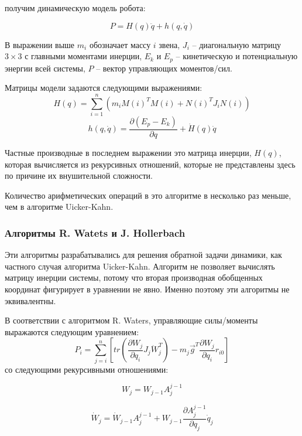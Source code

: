 получим динамическую модель робота:

\begin{equation}
P = H(q) \ddot q + h(q, \dot q)
\end{equation}

В выражении выше $m_i$ обозначает массу $i$ звена, $J_i$ -- диагональную матрицу $3 \times 3$ с главными моментами инерции, $E_k$ и $E_p$ -- кинетическую и потенциальную энергии всей системы, $P$ -- вектор управляющих моментов/сил.

Матрицы модели задаются следующими выражениями:
\begin{equation}
H(q) = \sum_{i=1}^{n}
(
m_i M(i)^T M(i) + N(i)^T J_i N(i)
)
\end{equation}
\begin{equation}
h(q, \dot q) = \frac{\partial (E_p - E_k)}{\partial q} + \dot H(q) \dot q
\end{equation}

Частные производные в последнем выражении это матрица инерции, $H(q)$, которая вычисляется из рекурсивных отношений, которые не представлены здесь по причине их внушительной сложности.

Количество арифметических операций в это алгоритме в несколько раз меньше, чем в алгоритме Uicker-Kahn. 

\subsubsection{Алгоритмы R. Watets и J. Hollerbach}
Эти алгоритмы разрабатывались для решения обратной задачи динамики, как частного случая алгоритма Uicker-Kahn.
Алгоритм не позволяет вычислять матрицу инерции системы, потому что вторая производная обобщенных координат фигурирует в уравнении не явно. Именно поэтому эти алгоритмы не эквивалентны.

В соответствии с алгоритмом R. Waters, управляющие силы/моменты выражаются следующим уравнением:
\begin{equation}
\label{eq6}
P_i = 
\sum_{j=i}^{n}
\left[
tr(
\frac{\partial W_j}{\partial q_i} J_j \ddot W_j^T
)
- m_j \vec g^T \frac{\partial W_j}{\partial q_i} r_{i0}
\right]
\end{equation} 
со следующими рекурсивными отношениями:

\begin{equation}
W_j = W_{j-1} A_j^{j-1}
\end{equation}

\begin{equation}
\dot W_j = \dot W_{j-1} A_j^{j-1} + W_{j-1} \frac{\partial A_j^{j-1}}{\partial q_j} \dot q_j
\end{equation}

